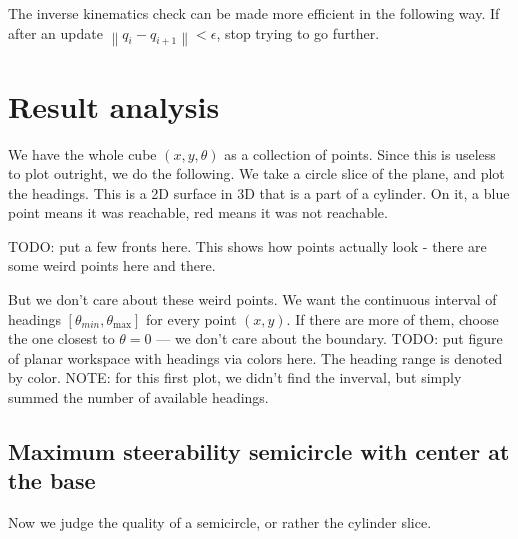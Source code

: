 \documentclass{article}
\begin{document}
The inverse kinematics check can be made more efficient in the following way.
If after an update $\left\lVert q_i - q_{i+1} \right\rVert < \epsilon $, stop trying to go further.


\section{Result analysis}
We have the whole cube $(x,y,\theta)$ as a collection of points.
Since this is useless to plot outright, we do the following.
We take a circle slice of the plane, and plot the headings. This is a 2D surface in 3D 
that is a part of a cylinder.
On it, a blue point means it was reachable, red means it was not reachable.

TODO: put a few fronts here.
This shows how points actually look - there are some weird points here and there.


But we don't care about these weird points. We want the continuous interval of headings
$[\theta_{min}, \theta_{\max}]$ for every point $(x,y)$.
If there are more of them, choose the one closest to $\theta = 0$ --- we don't care about the boundary.
TODO: put figure of planar workspace with headings via colors here.
The heading range is denoted by color.
NOTE: for this first plot, we didn't find the inverval, but simply summed the number of available headings.



\subsection{Maximum steerability semicircle with center at the base}
Now we judge the quality of a semicircle, or rather the cylinder slice.

\end{document}
